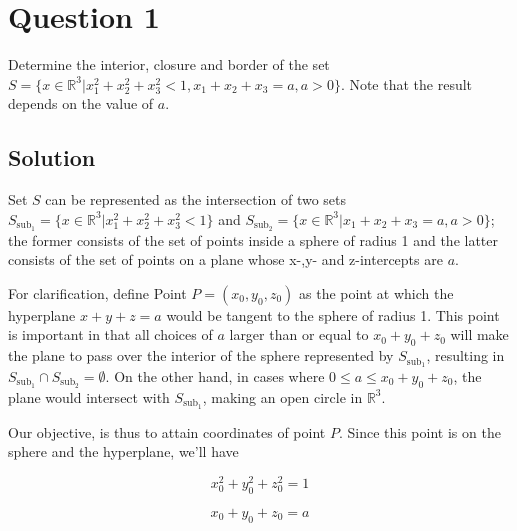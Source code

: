 
\section*{Question 1}

Determine the interior, closure and border of the set $S = \{x \in \mathbb{R}^3 | x_1^2 + x_2^2 + x_3^2 < 1, x_1+x_2+x_3 = a, a > 0\}$.
Note that the result depends on the value of $a$.

\subsection*{Solution}

Set $S$ can be represented as the intersection of two sets $S_{\text{sub}_1} = \{x \in \mathbb{R}^3 | x_1^2 + x_2^2 + x_3^2 < 1\}$ and $S_{\text{sub}_2} = \{x \in \mathbb{R}^3 | x_1 + x_2 + x_3 = a, a > 0\}$; the former consists of the set of points inside a sphere of radius 1 and the latter consists of the set of points on a plane whose x-,y- and z-intercepts are $a$.

For clarification, define Point $P = (x_0, y_0, z_0)$ as the point at which the hyperplane $x + y + z = a$ would be tangent to the sphere of radius 1.
This point is important in that all choices of $a$ larger than or equal to $x_0 + y_0 + z_0$ will make the plane to pass over the interior of the sphere represented by $S_{\text{sub}_1}$, resulting in $S_{\text{sub}_1} \cap S_{\text{sub}_2} = \emptyset$.
On the other hand, in cases where $0 \leq a \leq x_0+y_0+z_0$, the plane would intersect with $S_{\text{sub}_1}$, making an open circle in $\mathbb{R}^3$.

Our objective, is thus to attain coordinates of point $P$.
Since this point is on the sphere and the hyperplane, we'll have

\begin{equation}
x_0^2 + y_0^2 + z_0^2 = 1
\label{eq11}
\end{equation}

\begin{equation}
x_0 + y_0 + z_0 = a
\label{eq12}
\end{equation}

